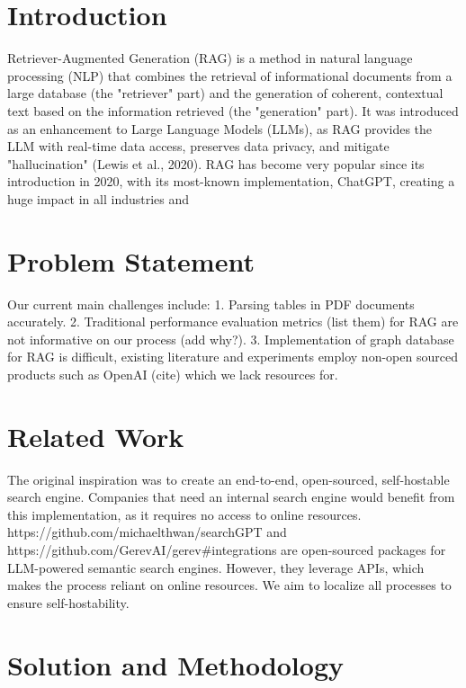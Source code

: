 \documentclass{scrartcl}
\begin{document}
\section{Introduction}
Retriever-Augmented Generation (RAG) is a method in natural language processing (NLP) that combines the retrieval of informational documents from a large database (the "retriever" part) and the generation of coherent, contextual text based on the information retrieved (the "generation" part).
It was introduced as an enhancement to Large Language Models (LLMs), as RAG provides the LLM with real-time data access, preserves data privacy, and mitigate "hallucination" (Lewis et al., 2020).
RAG has become very popular since its introduction in 2020, with its most-known implementation, ChatGPT, creating a huge impact in all industries and

\section{Problem Statement}
Our current main challenges include:
1. Parsing tables in PDF documents accurately.
2. Traditional performance evaluation metrics (list them) for RAG are not informative on our process (add why?). 
3. Implementation of graph database for RAG is difficult, existing literature and experiments employ non-open sourced products such as OpenAI (cite) which we lack resources for.


\section{Related Work}
The original inspiration was to create an end-to-end, open-sourced, self-hostable search engine. Companies that need an internal search engine would benefit from this implementation, as it requires no access to online resources.
https://github.com/michaelthwan/searchGPT and https://github.com/GerevAI/gerev#integrations are open-sourced packages for LLM-powered semantic search engines. However, they leverage APIs, which makes the process reliant on online resources. We aim to localize all processes to ensure self-hostability.
\section{Solution and Methodology}
\end{document}
